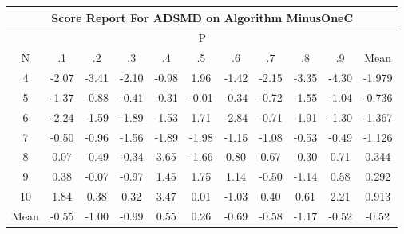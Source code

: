 \documentclass[11pt,a4paper]{report}
\begin{document}
\begin{longtable}{ | c || c | c | c | c | c | c | c | c | c || c |}
\hline
\multicolumn{11}{|c|}{ Score Report For ADSMD on Algorithm MinusOneC} \\
\hline
\multicolumn{11}{|c|}{ P } \\
\hline
N & .1 & .2 & .3 & .4 & .5 & .6 & .7 & .8 & .9 & Mean\\
 \hline
 \hline
 \endhead
  4 &  \cellcolor[HTML]{FFC7C7} -2.07 &  \cellcolor[HTML]{FFA7A7} -3.41 &  \cellcolor[HTML]{FFC7C7} -2.10 &  \cellcolor[HTML]{FFE7E7} -0.98 &  \cellcolor[HTML]{CFCFFF} 1.96 &  \cellcolor[HTML]{FFDFDF} -1.42 &  \cellcolor[HTML]{FFC7C7} -2.15 &  \cellcolor[HTML]{FFA7A7} -3.35 &  \cellcolor[HTML]{FF8F8F} -4.30 & -1.979 \\
  5 &  \cellcolor[HTML]{FFDFDF} -1.37 &  \cellcolor[HTML]{FFE7E7} -0.88 &  \cellcolor[HTML]{FFF7F7} -0.41 &  \cellcolor[HTML]{FFF7F7} -0.31 &  \cellcolor[HTML]{FFFFFF} -0.01 &  \cellcolor[HTML]{FFF7F7} -0.34 &  \cellcolor[HTML]{FFEFEF} -0.72 &  \cellcolor[HTML]{FFD7D7} -1.55 &  \cellcolor[HTML]{FFE7E7} -1.04 & -0.736 \\
  6 &  \cellcolor[HTML]{FFC7C7} -2.24 &  \cellcolor[HTML]{FFD7D7} -1.59 &  \cellcolor[HTML]{FFCFCF} -1.89 &  \cellcolor[HTML]{FFD7D7} -1.53 &  \cellcolor[HTML]{D7D7FF} 1.71 &  \cellcolor[HTML]{FFB7B7} -2.84 &  \cellcolor[HTML]{FFEFEF} -0.71 &  \cellcolor[HTML]{FFCFCF} -1.91 &  \cellcolor[HTML]{FFDFDF} -1.30 & -1.367 \\
  7 &  \cellcolor[HTML]{FFEFEF} -0.50 &  \cellcolor[HTML]{FFE7E7} -0.96 &  \cellcolor[HTML]{FFD7D7} -1.56 &  \cellcolor[HTML]{FFCFCF} -1.89 &  \cellcolor[HTML]{FFCFCF} -1.98 &  \cellcolor[HTML]{FFDFDF} -1.15 &  \cellcolor[HTML]{FFE7E7} -1.08 &  \cellcolor[HTML]{FFEFEF} -0.53 &  \cellcolor[HTML]{FFEFEF} -0.49 & -1.126 \\
  8 &  \cellcolor[HTML]{FFFFFF} 0.07 &  \cellcolor[HTML]{FFEFEF} -0.49 &  \cellcolor[HTML]{FFF7F7} -0.34 &  \cellcolor[HTML]{A7A7FF} 3.65 &  \cellcolor[HTML]{FFD7D7} -1.66 &  \cellcolor[HTML]{E7E7FF} 0.80 &  \cellcolor[HTML]{EFEFFF} 0.67 &  \cellcolor[HTML]{FFF7F7} -0.30 &  \cellcolor[HTML]{EFEFFF} 0.71 & 0.344 \\
  9 &  \cellcolor[HTML]{F7F7FF} 0.38 &  \cellcolor[HTML]{FFFFFF} -0.07 &  \cellcolor[HTML]{FFE7E7} -0.97 &  \cellcolor[HTML]{D7D7FF} 1.45 &  \cellcolor[HTML]{CFCFFF} 1.75 &  \cellcolor[HTML]{DFDFFF} 1.14 &  \cellcolor[HTML]{FFEFEF} -0.50 &  \cellcolor[HTML]{FFDFDF} -1.14 &  \cellcolor[HTML]{EFEFFF} 0.58 & 0.292 \\
  10 &  \cellcolor[HTML]{CFCFFF} 1.84 &  \cellcolor[HTML]{F7F7FF} 0.38 &  \cellcolor[HTML]{F7F7FF} 0.32 &  \cellcolor[HTML]{A7A7FF} 3.47 &  \cellcolor[HTML]{FFFFFF} 0.01 &  \cellcolor[HTML]{FFE7E7} -1.03 &  \cellcolor[HTML]{F7F7FF} 0.40 &  \cellcolor[HTML]{EFEFFF} 0.61 &  \cellcolor[HTML]{C7C7FF} 2.21 & 0.913 \\
 \hline
 \hline
Mean &  \cellcolor[HTML]{FFEFEF} -0.55 &  \cellcolor[HTML]{FFE7E7} -1.00 &  \cellcolor[HTML]{FFE7E7} -0.99 &  \cellcolor[HTML]{EFEFFF} 0.55 &  \cellcolor[HTML]{F7F7FF} 0.26 &  \cellcolor[HTML]{FFEFEF} -0.69 &  \cellcolor[HTML]{FFEFEF} -0.58 &  \cellcolor[HTML]{FFDFDF} -1.17 &  \cellcolor[HTML]{FFEFEF} -0.52 &  \cellcolor[HTML]{FFEFEF} -0.52
\end{longtable}
\end{document}
